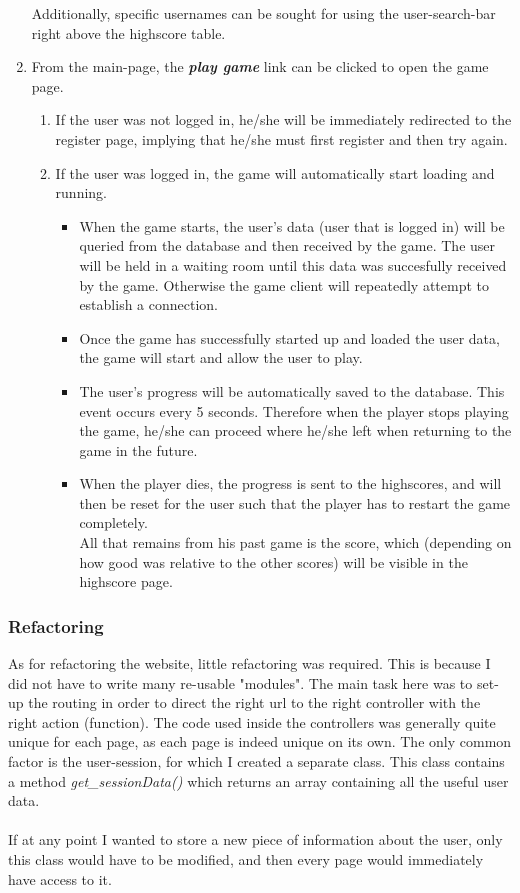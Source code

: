 \documentclass[12pt]{report}
\begin{document}
\begin{enumerate}
Additionally, specific usernames can be sought for using the user-search-bar right above the highscore table.
\item From the main-page, the \emph{\textbf{play game}} link can be clicked to open the game page.
\begin{enumerate}
\item If the user was not logged in, he/she will be immediately redirected to the register page, implying that he/she must first register and then try again.
\item If the user was logged in, the game will automatically start loading and running.
\begin{itemize}
\item When the game starts, the user's data (user that is logged in) will be queried from the database and then received by the game. The user will be held in a waiting room until this data was succesfully received by the game. Otherwise the game client will repeatedly attempt to establish a connection.
\item Once the game has successfully started up and loaded the user data, the game will start and allow the user to play.
\item The user's progress will be automatically saved to the database. This event occurs every 5 seconds. Therefore when the player stops playing the game, he/she can proceed where he/she left when returning to the game in the future.
\item When the player dies, the progress is sent to the highscores, and will then be reset for the user such that the player has to restart the game completely.\\All that remains from his past game is the score, which (depending on how good was relative to the other scores) will be visible in the highscore page.
\end{itemize}
\end{enumerate}
\end{enumerate}
\subsubsection{Refactoring}
As for refactoring the website, little refactoring was required. This is because I did not have to write many re-usable "modules". The main task here was to set-up the routing in order to direct the right url to the right controller with the right action (function). The code used inside the controllers was generally quite unique for each page, as each page is indeed unique on its own. The only common factor is the user-session, for which I created a separate class. This class contains a method \emph{get\_sessionData()} which returns an array containing all the useful user data.\\\\
If at any point I wanted to store a new piece of information about the user, only this class would have to be modified, and then every page would immediately have access to it.\\
\end{document}
